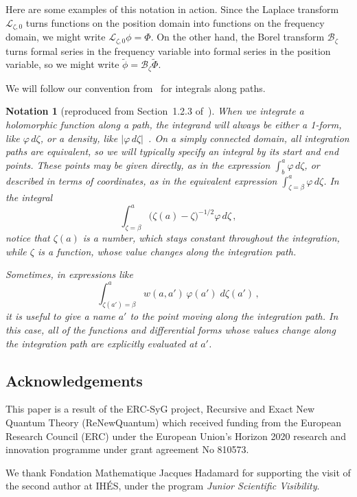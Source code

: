 \documentclass{article}
\newcommand{\series}[1]{\tilde{#1}}
\newcommand{\laplace}{\mathcal{L}}
\newcommand{\borel}{\mathcal{B}}
\theoremstyle{definition}
\theoremstyle{plain}
\newtheorem*{notation*}{Notation}
\begin{document}
Here are some examples of this notation in action. Since the Laplace transform $\laplace_{\zeta, 0}$ turns functions on the position domain into functions on the frequency domain, we might write $\laplace_{\zeta,0} \phi = \Phi$. On the other hand, the Borel transform $\borel_\zeta$ turns formal series in the frequency variable into formal series in the position variable, so we might write $\series{\phi} = \borel_\zeta \series{\Phi}$.

We will follow our convention from~\cite{reg-sing-volterra} for integrals along paths. 
\begin{notation*}[reproduced from Section~1.2.3 of~\cite{reg-sing-volterra}]
When we integrate a holomorphic function along a path, the integrand will always be either a 1-form, like $\varphi\,d\zeta$, or a density, like $|\varphi\,d\zeta|$~\cite[Section~1.8]{local-viewpoint}. On a simply connected domain, all integration paths are equivalent, so we will typically specify an integral by its start and end points. These points may be given directly, as in the expression $\int_b^a \varphi\,d\zeta$, or described in terms of coordinates, as in the equivalent expression $\int_{\zeta = \beta}^a \varphi\,d\zeta$. In the integral
\[ \int_{\zeta = \beta}^a \big(\zeta(a) - \zeta\big)^{-1/2} \varphi\,d\zeta\,, \]
notice that $\zeta(a)$ is a number, which stays constant throughout the integration, while $\zeta$ is a function, whose value changes along the integration path.

Sometimes, in expressions like
\[ \int_{\zeta(a') = \beta}^a w(a, a')\,\varphi(a')\;d\zeta(a')\,, \]
it is useful to give a name $a'$ to the point moving along the integration path. In this case, all of the functions and differential forms whose values change along the integration path are explicitly evaluated at $a'$.    
\end{notation*}
%
\subsection{Acknowledgements}
This paper is a result of the ERC-SyG project, Recursive and Exact New Quantum Theory (ReNewQuantum) which received funding from the European Research Council (ERC) under the European Union's Horizon 2020 research and innovation programme under grant agreement No 810573. 

We thank Fondation Mathematique Jacques Hadamard for supporting the visit of the second author at IH\'ES, under the program \textit{Junior Scientific Visibility}. 
\end{document}

